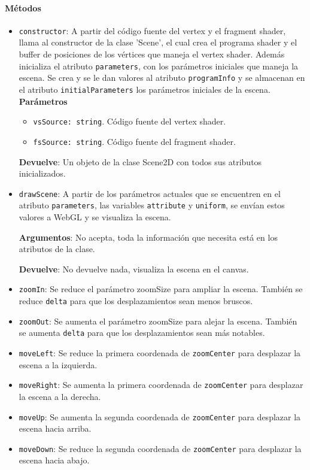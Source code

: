 \paragraph*{Métodos}
\begin{itemize}
    \item \verb|constructor|: A partir del código fuente del vertex y el fragment shader, llama al constructor de la clase 'Scene', el cual crea el programa shader y el buffer de posiciones de los vértices que maneja el vertex shader. Además inicializa el atributo \verb|parameters|, con los parámetros iniciales que maneja la escena. Se crea y se le dan valores al atributo \verb|programInfo| y se almacenan en el atributo \verb|initialParameters| los parámetros iniciales de la escena.
    \textbf{Parámetros}
    \begin{itemize}
        \item \verb|vsSource: string|. Código fuente del vertex shader.
        \item \verb|fsSource: string|. Código fuente del fragment shader.
    \end{itemize}
    
    \textbf{Devuelve}: Un objeto de la clase Scene2D con todos sus atributos inicializados.
    
    \item \verb|drawScene|: A partir de los parámetros actuales que se encuentren en el atributo \verb|parameters|, las variables \verb|attribute| y \verb|uniform|, se envían estos valores a WebGL y se visualiza la escena.
    
    \textbf{Argumentos}: No acepta, toda la información que necesita está en los atributos de la clase.
    
    \textbf{Devuelve}: No devuelve nada, visualiza la escena en el canvas.
    \item \verb|zoomIn|: Se reduce el parámetro zoomSize para ampliar la escena. También se reduce \verb|delta| para que los desplazamientos sean menos bruscos.
    \item \verb|zoomOut|: Se aumenta el parámetro zoomSize para alejar la escena. También se aumenta \verb|delta| para que los desplazamientos sean más notables.
    \item \verb|moveLeft|: Se reduce la primera coordenada de \verb|zoomCenter| para desplazar la escena a la izquierda.
    \item \verb|moveRight|: Se aumenta la primera coordenada de \verb|zoomCenter| para desplazar la escena a la derecha.
    \item \verb|moveUp|: Se aumenta la segunda coordenada de \verb|zoomCenter| para desplazar la escena hacia arriba.
    \item \verb|moveDown|: Se reduce la segunda coordenada de \verb|zoomCenter| para desplazar la escena hacia abajo.
\end{itemize}

